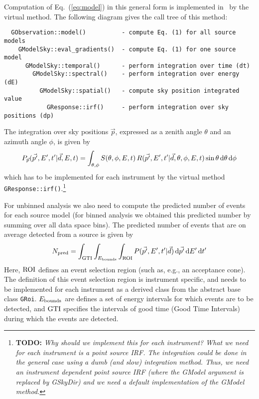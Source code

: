 \documentclass{article}[12pt,a4]
\begin{document}
Computation of Eq.~(\ref{eq:model}) in this general form is implemented in \this\ by the 
virtual method.
The following diagram gives the call tree of this method:
\begin{verbatim}
  GObservation::model()          - compute Eq. (1) for all source models
    GModelSky::eval_gradients()  - compute Eq. (1) for one source model
      GModelSky::temporal()      - perform integration over time (dt)
        GModelSky::spectral()    - perform integration over energy (dE)
          GModelSky::spatial()   - compute sky position integrated value
            GResponse::irf()     - perform integration over sky positions (dp)
\end{verbatim}
The integration over sky positions $\vec{p}$, expressed as a zenith angle $\theta$ and an
azimuth angle $\phi$, is given by
\begin{equation}
P_{\vec{p}}(\vec{p'}, E', t' | \vec{d}, E, t) = 
\int_{\theta, \phi} S(\theta, \phi, E, t) \, R(\vec{p'}, E', t' | \vec{d}, \theta, \phi, E, t)
\sin \theta \, {\rm d}\theta \, {\rm d}\phi
\label{eq:pirf}
\end{equation}
which has to be implemented for each instrument by the virtual method
{\tt GResponse::irf()}.\footnote{
  {\bf TODO:}
  {\em Why should we implement this for each instrument?
  What we need for each instrument is a point source IRF.
  The integration could be done in the general case using a dumb (and slow)
integration method.
  Thus, we need an instrument dependent point source IRF (where the GModel argument
is replaced by GSkyDir) and we need a default implementation of  the GModel method.}
}

For unbinned analysis we also need to compute the predicted number of events
for each source model (for binned analysis we obtained this predicted number by
summing over all data space bins).
The predicted number of events that are on average detected from a source is given by
\begin{equation}
N_{\rm pred} = \int_{\rm GTI} \int_{E_{\rm bounds}} \int_{\rm ROI} 
P(\vec{p'}, E', t' | \vec{d}) \, {\rm d}\vec{p'} \, {\rm d}E' \,{\rm d}t'
\label{eq:npred}
\end{equation}
Here, ${\rm ROI}$ defines an event selection region (such as, e.g., an acceptance cone).
The definition of this event selection region is instrument specific, and needs to be
implemented for each instrument as a derived class from the abstract base class {\tt GRoi}.
$E_{\rm bounds}$ are defines a set of energy intervals for which events are to be detected,
and ${\rm GTI}$ specifies the intervals of good time (Good Time Intervals) during which
the events are detected.
\end{document}
